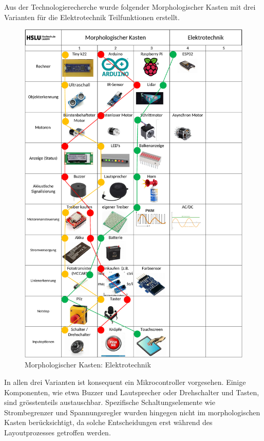Aus der Technologierecherche wurde folgender Morphologischer Kasten mit drei Varianten für die Elektrotechnik Teilfunktionen erstellt.

\begin{figure}[H]
\centering
\includegraphics[width=\textwidth -5mm]{assets/MK_Elektrotechnik.pdf}
\caption{Morphologischer Kasten: Elektrotechnik}
\label{fig:mk-elektrotechnik}
\end{figure}

In allen drei Varianten ist konsequent ein Mikrocontroller vorgesehen. Einige Komponenten, wie etwa Buzzer und Lautsprecher oder Drehschalter und Tasten, sind grösstenteils austauschbar. Spezifische Schaltungselemente wie Strombegrenzer und Spannungsregler wurden hingegen nicht im morphologischen Kasten berücksichtigt, da solche Entscheidungen erst während des Layoutprozesses getroffen werden.


